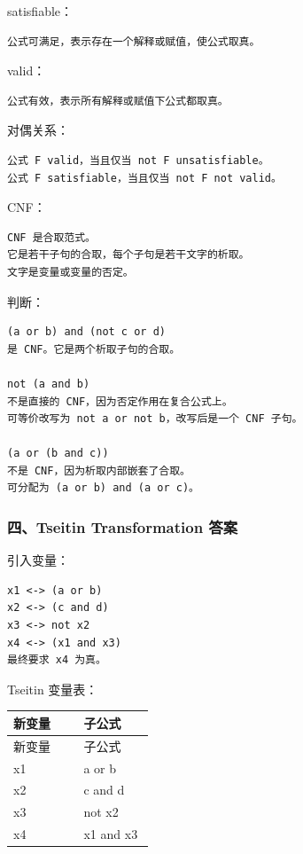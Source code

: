 \documentclass[UTF8]{ctexart}
\begin{document}
satisfiable：

\begin{Verbatim}[fontsize=\small,breaklines=true]
公式可满足，表示存在一个解释或赋值，使公式取真。
\end{Verbatim}

valid：

\begin{Verbatim}[fontsize=\small,breaklines=true]
公式有效，表示所有解释或赋值下公式都取真。
\end{Verbatim}

对偶关系：

\begin{Verbatim}[fontsize=\small,breaklines=true]
公式 F valid，当且仅当 not F unsatisfiable。
公式 F satisfiable，当且仅当 not F not valid。
\end{Verbatim}

CNF：

\begin{Verbatim}[fontsize=\small,breaklines=true]
CNF 是合取范式。
它是若干子句的合取，每个子句是若干文字的析取。
文字是变量或变量的否定。
\end{Verbatim}

判断：

\begin{Verbatim}[fontsize=\small,breaklines=true]
(a or b) and (not c or d)
是 CNF。它是两个析取子句的合取。

not (a and b)
不是直接的 CNF，因为否定作用在复合公式上。
可等价改写为 not a or not b，改写后是一个 CNF 子句。

(a or (b and c))
不是 CNF，因为析取内部嵌套了合取。
可分配为 (a or b) and (a or c)。
\end{Verbatim}

\subsubsection*{四、Tseitin Transformation 答案}

引入变量：

\begin{Verbatim}[fontsize=\small,breaklines=true]
x1 <-> (a or b)
x2 <-> (c and d)
x3 <-> not x2
x4 <-> (x1 and x3)
最终要求 x4 为真。
\end{Verbatim}

Tseitin 变量表：

\begin{longtable}{|p{0.47\linewidth}|p{0.47\linewidth}|}
\hline
新变量 & 子公式 \\
\hline
\endfirsthead
新变量 & 子公式 \\
\hline
\endhead
x1 & a or b \\
\hline
x2 & c and d \\
\hline
x3 & not x2 \\
\hline
x4 & x1 and x3 \\
\hline
\end{longtable}
\end{document}
